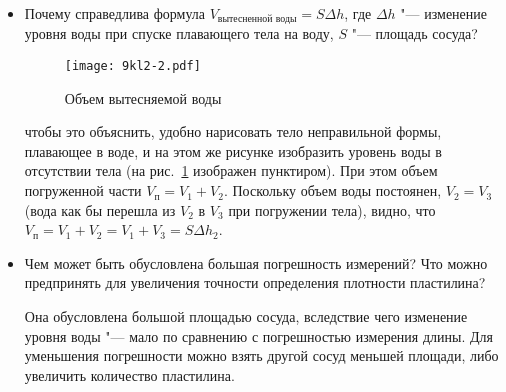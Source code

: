\begin{itemize}
  \item Почему справедлива формула \(V_\text{вытесненной воды} = S\Delta h\), где \(\Delta h\) "--- изменение уровня воды при спуске плавающего тела на воду, \(S\) "--- площадь сосуда?\par
  \begin{figure}[h!]
    \centering
    \texttt{[image: 9kl2-2.pdf]}
    \caption{Объем вытесняемой воды}
    \label{fig:9kl2:vol}
 \end{figure}
  \Answer чтобы это объяснить, удобно нарисовать тело неправильной формы, плавающее в воде, и на этом же рисунке изобразить уровень воды в отсутствии тела (на рис.~\ref{fig:9kl2:vol} изображен пунктиром). \label{ans:9kl2:vol}
 При этом объем погруженной части \(V_\text{п} = V_1 + V_2\). Поскольку объем воды постоянен, \(V_2 = V_3\) (вода как бы перешла из \(V_2\) в \(V_3\) при погружении тела), видно, что \(V_\text{п} = V_1 + V_2=V_1+V_3=S\Delta h_2\).
  \item Чем может быть обусловлена большая погрешность измерений? Что можно предпринять для увеличения точности определения плотности пластилина?\par
  \Answer Она обусловлена большой площадью сосуда, вследствие чего изменение уровня воды "--- мало по сравнению с погрешностью измерения длины. Для уменьшения погрешности можно взять другой сосуд меньшей площади, либо увеличить количество пластилина.
\end{itemize}
